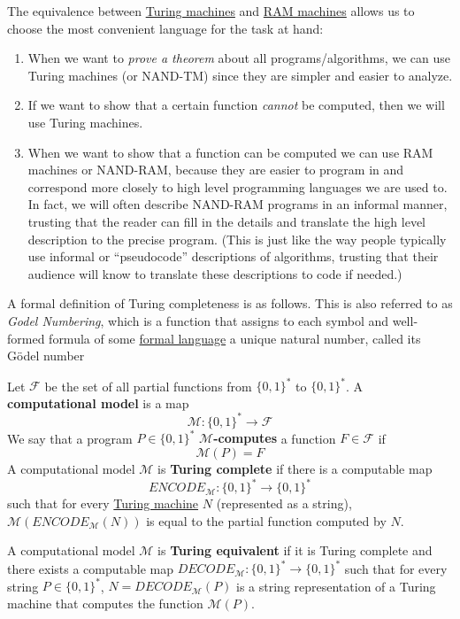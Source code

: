  The equivalence between \hyperref[def:turing-machine]{Turing machines} and \hyperref[def:ram-machine]{RAM machines} allows us to choose the most convenient language for the task at hand: 
  \begin{enumerate}
      \item When we want to \textit{prove a theorem} about all programs/algorithms, we can use Turing machines (or NAND-TM) since they are simpler and easier to analyze. 
      \item If we want to show that a certain function \textit{cannot} be computed, then we will use Turing machines. 
      \item When we want to show that a function can be computed we can use RAM machines or NAND-RAM, because they are easier to program in and correspond more closely to high level programming languages we are used to. In fact, we will often describe NAND-RAM programs in an informal manner, trusting that the reader can fill in the details and translate the high level description to the precise program. (This is just like the way people typically use informal or “pseudocode” descriptions of algorithms, trusting that their audience will know to translate these descriptions to code if needed.)
  \end{enumerate}

  A formal definition of Turing completeness is as follows. This is also referred to as \textit{Godel Numbering}, which is a function that assigns to each symbol and well-formed formula of some \hyperref[def:formal-language]{formal language} a unique natural number, called its Gödel number 

  \begin{definition}
    \label{def:turing-completeness-and-equivalence}
  Let $\mathcal{F}$ be the set of all partial functions from $\{0, 1\}^*$ to $\{0,1\}^*$. A \textbf{computational model} is a map
  \begin{equation}
    \mathcal{M}: \{0,1\}^* \to \mathcal{F}
  \end{equation}
  We say that a program $P \in \{0,1\}^*$ \textbf{$\mathcal{M}$-computes} a function $F \in \mathcal{F}$ if 
  \begin{equation}
    \mathcal{M}(P) = F
  \end{equation}
  A computational model $\mathcal{M}$ is \textbf{Turing complete} if there is a computable map 
  \begin{equation}
    ENCODE_{\mathcal{M}} : \{0,1\}^* \to \{0,1\}^*
  \end{equation}
  such that for every \hyperref[def:turing-machine]{Turing machine} $N$ (represented as a string), $\mathcal{M}(ENCODE_\mathcal{M} (N))$ is equal to the partial function computed by $N$. 

  A computational model $\mathcal{M}$ is \textbf{Turing equivalent} if it is Turing complete and there exists a computable map $DECODE_\mathcal{M}: \{0,1\}^* \to \{0,1\}^*$ such that for every string $P \in \{0,1\}^*$, $N = DECODE_\mathcal{M} (P)$ is a string representation of a Turing machine that computes the function $\mathcal{M}(P)$. 
  \end{definition} 

